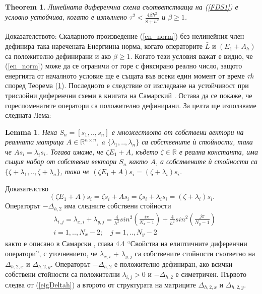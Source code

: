 \documentclass{article}
\newcommand{\be}{\begin{equation}}
\newcommand{\ee}{\end{equation}}
\newcommand{\rf}[1]{(\ref{#1})}
\newcommand{\RR}{\mathbb{R}}
\newtheorem{thm}{Theorem}
\newtheorem{lm}{Lemma}
\theoremstyle{remark}
\begin{document}
\begin{thm}\label{th1}
Линейната диференчна схема съответстваща на \rf{FDS1} е условно устойчива, когато е изпълнено
$\tau^2 < \frac{4 \beta h^2}{8 + h^2}$ и $\beta \ge 1$.
\end{thm}
Доказателството:
Скаларното произведение \rf{en_norm} без нелинейния член дефинира така наречената Енергиина норма, когато операторите $\bar{L}$ и $(E_1 + A_h)$ са положително дефинирани и ако $\beta \ge 1$. Когато тези условия важат е видно, че \rf{en_norm} може да се ограничи от горе с фиксирано реално число, защото енергията от началното условие ще е същата във всеки един момент от време $\tau k$ според Теорема \rf{th1}. Последното е следствие от изследване на устойчивост при трислойни диференчни схеми в книгата на Самарский \cite{samarski}. Остава да се покаже, че гореспоменатите оператори са положително дефинирани. За целта ще използваме следната Лема:

\begin{lm}\label{lemma1}
Нека $S_n=[s_1,..,s_n]$ е множеството от собствени вектори на реалната матрица $A \in \RR^{n\times n}$,
a $\{\lambda_1,..,\lambda_n\}$ са собствените ѝ стойности, така че $A s_i = \lambda_i s_i$. Тогава имаме, че $\zeta E_1 + A$, където $\zeta \in \RR$ е реална константа, има същия набор от собствени вектори $S_n$ както $A$, а собствените ѝ стойности са $\{\zeta + \lambda_1,..,\zeta + \lambda_n\}$, така че $(\zeta E_1 + A)  s_i = (\zeta+ \lambda_i) s_i$.
\end{lm}
Доказателство
\be
(\zeta E_1 + A)  s_i = \zeta s_i + A  s_i = \zeta s_i + \lambda_i s_i = (\zeta + \lambda_i) s_i.
\ee
Операторът $-\Delta_{h,2}$ има следните собствени стойности
\begin{align}\label{eigDeltah}
&\lambda_{i,j} = \lambda_{x, i} + \lambda_{y,j} = \frac{4}{h^2}sin^2(\frac{i \pi}{N_x-1}) +  \frac{4}{h^2}sin^2(\frac{j \pi}{N_y-1}) \\
&i = 1,..,N_x-2; \quad j = 1, .. , N_y-2 \nonumber
\end{align}
както е описано в Самарски \cite{samarski}, глава 4.4 ``Свойства на елиптичните диференчни оператори'', с уточнението, че $\lambda_{x, i}$ + $\lambda_{y,j}$ са собствените стойности съответно на $\Delta_{h,2,x}$ и $\Delta_{h,2,y}$. Операторът $-\Delta_{h,2}$ е положително дефиниран, ако всички собствени стойности са положителни $\lambda_{i,j}>0$ и $-\Delta_{h,2}$ е симетричен. Първото следва от \rf{eigDeltah} а второто от структурата на матриците $\Delta_{h,2,x}$ и $\Delta_{h,2,y}$.
\end{document}
